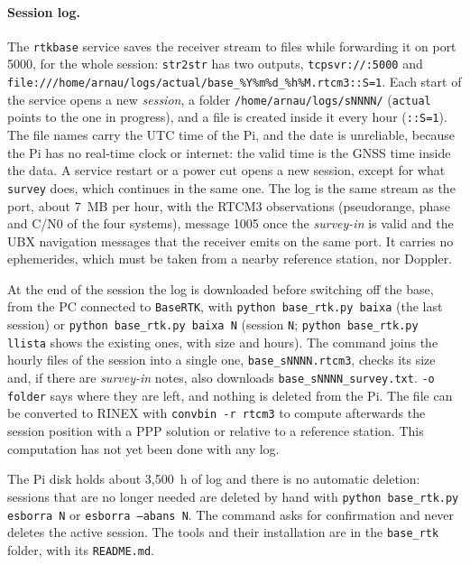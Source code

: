 \paragraph{Session log.} The \texttt{rtkbase} service saves the receiver stream to files while forwarding it on port 5000, for the whole session: \texttt{str2str} has two outputs, \texttt{tcpsvr://:5000} and \texttt{file:///home/arnau/logs/actual/base\_\%Y\%m\%d\_\%h\%M.rtcm3::S=1}. Each start of the service opens a new \emph{session}, a folder \texttt{/home/arnau/logs/sNNNN/} (\texttt{actual} points to the one in progress), and a file is created inside it every hour (\texttt{::S=1}). The file names carry the UTC time of the Pi, and the date is unreliable, because the Pi has no real-time clock or internet: the valid time is the GNSS time inside the data. A service restart or a power cut opens a new session, except for what \texttt{survey} does, which continues in the same one. The log is the same stream as the port, about 7~MB per hour, with the RTCM3 observations (pseudorange, phase and C/N0 of the four systems), message 1005 once the \emph{survey-in} is valid and the UBX navigation messages that the receiver emits on the same port. It carries no ephemerides, which must be taken from a nearby reference station, nor Doppler.

At the end of the session the log is downloaded before switching off the base, from the PC connected to \texttt{BaseRTK}, with \texttt{python base\_rtk.py baixa} (the last session) or \texttt{python base\_rtk.py baixa N} (session \texttt{N}; \texttt{python base\_rtk.py llista} shows the existing ones, with size and hours). The command joins the hourly files of the session into a single one, \texttt{base\_sNNNN.rtcm3}, checks its size and, if there are \emph{survey-in} notes, also downloads \texttt{base\_sNNNN\_survey.txt}. \texttt{-o folder} says where they are left, and nothing is deleted from the Pi. The file can be converted to RINEX with \texttt{convbin -r rtcm3} to compute afterwards the session position with a PPP solution or relative to a reference station. This computation has not yet been done with any log.

The Pi disk holds about 3,500~h of log and there is no automatic deletion: sessions that are no longer needed are deleted by hand with \texttt{python base\_rtk.py esborra N} or \texttt{esborra --abans N}. The command asks for confirmation and never deletes the active session. The tools and their installation are in the \texttt{base\_rtk} folder, with its \texttt{README.md}.

